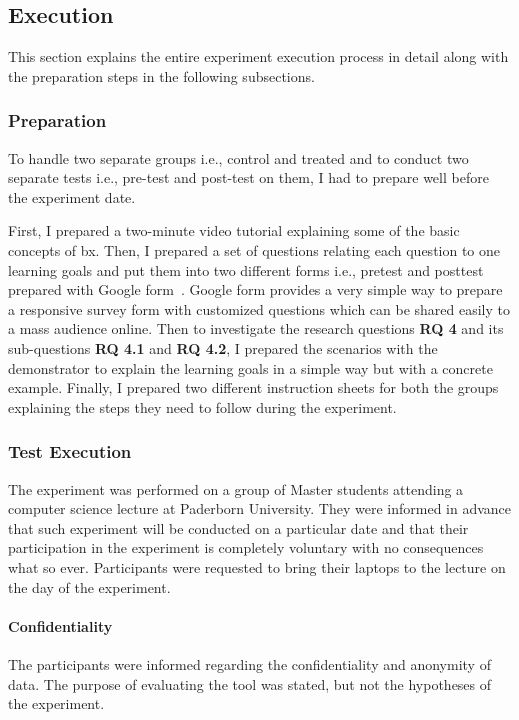 \subsection{Execution}\label{subsec:execution} 
This section explains the entire experiment execution process in detail along with the preparation steps in the following subsections.

\subsubsection{Preparation }\label{subsubsec:prep}
To handle two separate groups i.e., control and treated and to conduct two separate tests i.e., pre-test and post-test on them, I had to prepare well before the experiment date. 

First, I prepared a two-minute video tutorial explaining some of the basic concepts of bx. Then, I prepared a set of questions relating each question to one learning goals and put them into two different forms i.e., pretest and posttest prepared with Google form~\cite{google-forms}. Google form provides a very simple way to prepare a responsive survey form with customized questions which can be shared easily to a mass audience online. Then to investigate the research questions \textbf{RQ 4} and its sub-questions \textbf{RQ 4.1} and \textbf{RQ 4.2}, I prepared the scenarios with the demonstrator to explain the learning goals in a simple way but with a concrete example. Finally, I prepared two different instruction sheets for both the groups explaining the steps they need to follow during the experiment.

\subsubsection{Test Execution}\label{subsubsec:execution}
The experiment was performed on a group of Master students attending a computer science lecture at Paderborn University. They were informed in advance that such experiment will be conducted on a particular date and that their participation in the experiment is completely voluntary with no consequences what so ever. Participants were requested to bring their laptops to the lecture on the day of the experiment.

\paragraph{Confidentiality} The participants were informed regarding the confidentiality and anonymity of data. The purpose of evaluating the tool was stated, but not the hypotheses of the experiment.

